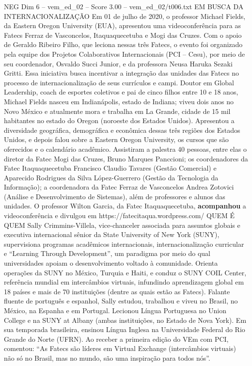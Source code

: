 \begin{textsample}{NEG Dim 6 – vem\_ed\_02 – Score 3.00 – vem\_ed\_02/t006.txt}  \label{ex:f6_neg_057}
EM BUSCA DA INTERNACIONALIZAÇÃO Em 01 de julho de 2020, o professor Michael Fields, da Eastern Oregon University (EUA), apresentou uma videoconferência para as Fatecs Ferraz de Vasconcelos, Itaquaquecetuba e Mogi das Cruzes.
Com o apoio de Geraldo Ribeiro Filho, que leciona nessas três Fatecs, o evento foi organizado pela equipe dos Projetos Colaborativos Internacionais (PCI – Cesu), por meio de seu coordenador, Osvaldo Succi Junior, e da professora Neusa Haruka Sezaki Gritti.
Essa iniciativa busca incentivar a integração das unidades das Fatecs no processo de internacionalização de seus currículos e campi.
Doutor em Global Leadership, coach de esportes coletivos e pai de cinco filhos entre 10 e 18 anos, Michael Fields nasceu em Indianápolis, estado de Indiana; viveu dois anos no Novo México e atualmente mora e trabalha em La Grande, cidade de 15 mil habitantes no estado do Oregon (noroeste dos Estados Unidos).
Apresentou a diversidade geográfica, demográfica e econômica dessas três regiões dos Estados Unidos, e depois falou sobre a Eastern Oregon University, os cursos que são oferecidos e o calendário acadêmico.
Assistiram a palestra 40 pessoas, entre elas o diretor da Fatec Mogi das Cruzes, Bruno Marques Panccioni; os coordenadores da Fatec Itaquaquecetuba Francisco Claudio Tavares (Gestão Comercial) e Aparecido Rodrigues da Silva López-Guerrero (Gestão da Tecnologia da Informação); a coordenadora da Fatec Ferraz de Vasconcelos Andrea Zotovici (Análise e Desenvolvimento de Sistemas), além de professores e alunos das unidades.
O professor Wilton Garcia, da Fatec Itaquaquecetuba, \textbf{acompanhou} a videoconferência e divulgou em https://fatecitaqua.wordpress.com/ QUEM É QUEM Sally Crimmins-Villela, vice-chanceler associada para assuntos globais e executiva internacional sênior da State University of New York (SUNY), supervisiona programas acadêmicos internacionais, internacionalização curricular e “Learning Through Development”, um paradigma por meio do qual universidades apoiam o desenvolvimento voltado à comunidade.
Orienta operações da SUNY no México, Turquia e Haiti, e conduz o SUNY COIL Center, referência mundial em intercâmbios virtuais, infundindo aprendizagem global em 18 países e mais de 70 instituições (dentre as quais estão as Fatecs).
Falante fluente de português e espanhol, Sally estudou, trabalhou e viveu no Brasil, no México, na Espanha e em Portugal.
Lecionou Língua Portuguesa no Union College e na SUNY at Albany (ambas instituições, no Estado de Nova York).
Em sua temporada brasileira, ensinou Língua Inglesa na Universidade Federal do Rio Grande do Norte (UFRN).
Ao receber a primeira edição do VEm com PCI, comentou: “As Fatecs são líderes em Virtual Exchange (intercâmbios virtuais) não só no Brasil, mas no mundo, são uma inspiração para todos nós”.

\end{textsample}
